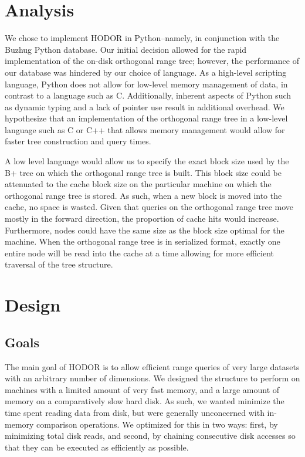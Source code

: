 \documentclass[11pt, oneside]{article}
\begin{document}
\section{Analysis}

We chose to implement HODOR in Python--namely, in conjunction with the Buzhug Python database. Our initial decision allowed for the rapid implementation of the on-disk orthogonal range tree; however, the performance of our database was hindered by our choice of language. As a high-level scripting language, Python does not allow for low-level memory management of data, in contrast to a language such as C. Additionally, inherent aspects of Python such as dynamic typing and a lack of pointer use result in additional overhead. We hypothesize that an implementation of the orthogonal range tree in a low-level language such as C or C++ that allows memory management would allow for faster tree construction and query times. 

A low level language would allow us to specify the exact block size used by the B+ tree on which the orthogonal range tree is built. This block size could be attenuated to the cache block size on the particular machine on which the orthogonal range tree is stored. As such, when a new block is moved into the cache, no space is wasted. Given that queries on the orthogonal range tree move mostly in the forward direction, the proportion of cache hits would increase. Furthermore, nodes could have the same size as the block size optimal for the machine. When the orthogonal range tree is in serialized format, exactly one entire node will be read into the cache at a time allowing for more efficient traversal of the tree structure.










\section{Design}

\subsection{Goals}
The main goal of HODOR is to allow efficient range queries of very large
datasets with an arbitrary number of dimensions. We designed the structure to
perform on machines with a limited amount of very fast memory, and a large
amount of memory on a comparatively slow hard disk. As such, we wanted minimize
the time spent reading data from disk, but were generally unconcerned with
in-memory comparison operations. We optimized for this in two ways: first, by
minimizing total disk reads, and second, by chaining consecutive disk accesses
so that they can be executed as efficiently as possible. 
\end{document}
